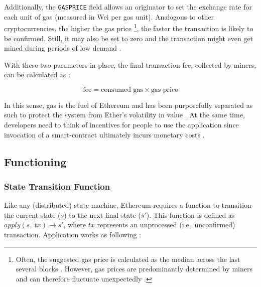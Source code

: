 Additionally, the \texttt{GASPRICE} field allows an originator to set the exchange rate for each unit of gas (measured in Wei per gas unit). Analogous to other cryptocurrencies, the higher the gas price \footnote{Often, the suggested gas price is calculated as the median across the last several blocks \cite[p.~153]{Antonopoulos.2018}. However, gas prices are predominantly determined by miners and can therefore fluctuate unexpectedly \cite[p.~54]{Antonopoulos.2018}.}, the faster the transaction is likely to be confirmed. Still, it may also be set to zero and the transaction might even get mined during periods of low demand \cite[p.~153]{Antonopoulos.2018}. 

With these two parameters in place, the final transaction fee, collected by miners, can be calculated as \cite[p.~53]{Antonopoulos.2018} \cite[p.~20]{ethereumWhitepaperGitHub}:

\begin{equation}
\label{eq:transactionFee}
\text{fee} = \text{consumed gas} \times \text{gas price}
\end{equation}

In this sense, gas is the fuel of Ethereum and has been purposefully separated as such to protect the system from Ether's volatility in value \cite[p.~152]{Antonopoulos.2018}. At the same time, developers need to think of incentives for people to use the application since invocation of a smart-contract ultimately incurs monetary costs \cite[p.~4]{blockchainTechnologyGrowth}. 

\subsection{Functioning}
\subsubsection{State Transition Function}
\label{sec:stateTransition}
Like any (distributed) state-machine, Ethereum requires a function to transition the current state ($s$) to the next final state ($s'$). This function is defined as $apply(s,\ tx) \rightarrow s'$, where $tx$ represents an unprocessed (i.e.~unconfirmed) transaction. Application works as following \cite[p.~20]{ethereumWhitepaperGitHub}:  

